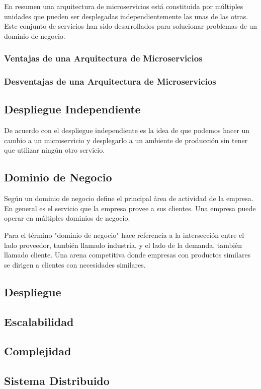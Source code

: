 En resumen una arquitectura de microservicios está constituida por múltiples unidades que pueden ser
desplegadas independientemente las unas de las otras. Este conjunto de servicios han sido desarrollados
para solucionar problemas de un dominio de negocio.

\subsubsection{Ventajas de una Arquitectura de Microservicios}
\subsubsection{Desventajas de una Arquitectura de Microservicios}

\subsection{Despliegue Independiente}
De acuerdo con \cite{newman2019monolith} el despliegue independiente es la idea de que podemos
hacer un cambio a un microservicio y desplegarlo a un ambiente de producción sin tener que utilizar
ningún otro servicio.

\subsection{Dominio de Negocio}
Según \cite{khononov2021learning} un dominio de negocio define el principal área de actividad de
la empresa. En general es el servicio que la empresa provee a sus clientes.
Una empresa puede operar en múltiples dominios de negocio.

Para \cite{houthoofd2010analyzing} el término "dominio de negocio" hace referencia a la intersección
entre el lado proveedor, también llamado industria, y el lado de la demanda, también llamado cliente.
Una arena competitiva donde empresas con productos similares se dirigen a clientes con necesidades
similares.


\subsection{Despliegue}

\subsection{Escalabilidad}

\subsection{Complejidad}

\subsection{Sistema Distribuido}

